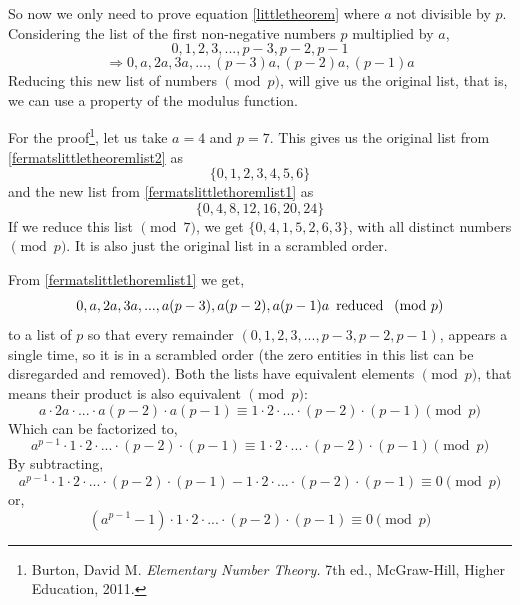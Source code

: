 \documentclass[a4paper,12pt]{article}
\theoremstyle{definition}
\begin{document}
So now we only need to prove equation \ref{littletheorem} where $a$ not divisible by $p$. 
Considering the list of the first non-negative numbers $p$ multiplied by $a$,
\begin{equation} \label{fermatslittletheoremlist2}
	0,1,2,3,...,p-3,p-2,p-1
\end{equation}
\begin{equation} \label{fermatslittlethoremlist1}
	\Rightarrow 0,a,2a,3a,...,(p-3)a,(p-2)a,(p-1)a
\end{equation}
Reducing this new list of numbers $\pmod{p}$, will give us the original list, that is, we can use a property of the modulus function.

For the proof\footnote{Burton, David M. \textit{Elementary Number Theory.} 7th ed., McGraw-Hill, Higher Education, 2011.}, let us take $a=4$ and $p=7$. This gives us the original list from \ref{fermatslittletheoremlist2} as 
\begin{equation*}
	\{0,1,2,3,4,5,6\}
\end{equation*}
\indent and the new list from \ref{fermatslittlethoremlist1} as 
\begin{equation*}
	\{0,4,8,12,16,20,24\}
\end{equation*}
\indent If we reduce this list $\pmod{7}$, we get $\{0,4,1,5,2,6,3\}$, with all distinct numbers $\pmod p$. It is also just the original list in a scrambled order.

From \ref{fermatslittlethoremlist1} we get,
\begin{equation*}
    0,a,2a,3a,...,a(p-3),a(p-2),a(p-1)a \text{  \thinspace reduced } \pmod p
\end{equation*}
\indent to a list of $p$ so that every  remainder $(0,1,2,3,...,p-3,p-2,p-1)$, appears a single time, so it is in a scrambled order (the zero entities in this list can be disregarded and removed). Both the lists have equivalent elements $\pmod p$, that means their product is also equivalent  $\pmod{p}$:
\begin{equation}
	a \cdot 2a \cdot ...\cdot a(p-2) \cdot a(p-1) \equiv 1 \cdot 2 \cdot ... \cdot (p-2) \cdot (p-1) \pmod p
\end{equation}
\indent Which can be factorized to,
\begin{equation}
	a^{p-1} \cdot 1 \cdot 2 \cdot ... \cdot (p-2) \cdot (p-1) \equiv 1 \cdot 2 \cdot ... \cdot (p-2) \cdot (p-1) \pmod p 
\end{equation}
\indent By subtracting,
\begin{equation}
	a^{p-1} \cdot 1 \cdot 2 \cdot ... \cdot (p-2) \cdot (p-1)   - 1 \cdot 2 \cdot ... \cdot (p-2) \cdot (p-1) \equiv 0 \pmod p
\end{equation}
\indent or,
\begin{equation}
	(a^{p-1}-1) \cdot 1 \cdot 2 \cdot ... \cdot (p-2) \cdot (p-1)   \equiv 0 \pmod p
\end{equation}
\end{document}
